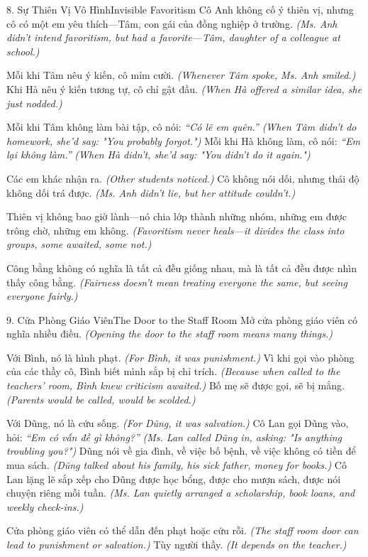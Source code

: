 \begin{truyen}{8. Sự Thiên Vị Vô Hình}{Invisible Favoritism}
Cô Anh không cố ý thiên vị, nhưng cô có một em yêu thích—Tâm, con gái của đồng nghiệp ở trường.
\textit{(Ms. Anh didn't intend favoritism, but had a favorite—Tâm, daughter of a colleague at school.)}

Mỗi khi Tâm nêu ý kiến, cô mỉm cười.
\textit{(Whenever Tâm spoke, Ms. Anh smiled.)}
Khi Hà nêu ý kiến tương tự, cô chỉ gật đầu.
\textit{(When Hà offered a similar idea, she just nodded.)}

Mỗi khi Tâm không làm bài tập, cô nói: \textit{``Có lẽ em quên.''}
\textit{(When Tâm didn't do homework, she'd say: "You probably forgot.")}
Mỗi khi Hà không làm, cô nói: \textit{``Em lại không làm.''  }
\textit{(When Hà didn't, she'd say: "You didn't do it again.")}

Các em khác nhận ra.
\textit{(Other students noticed.)}
Cô không nói dối, nhưng thái độ không dối trá được.
\textit{(Ms. Anh didn't lie, but her attitude couldn't.)}

Thiên vị không bao giờ lành—nó chia lớp thành những nhóm, những em được trông chờ, những em không.
\textit{(Favoritism never heals—it divides the class into groups, some awaited, some not.)}
\end{truyen}

\begin{baihoc}
Công bằng không có nghĩa là tất cả đều giống nhau, mà là tất cả đều được nhìn thấy công bằng.
\textit{(Fairness doesn't mean treating everyone the same, but seeing everyone fairly.)}
\end{baihoc}

\begin{truyen}{9. Cửa Phòng Giáo Viên}{The Door to the Staff Room}
Mở cửa phòng giáo viên có nghĩa nhiều điều.
\textit{(Opening the door to the staff room means many things.)}

Với Bình, nó là hình phạt.
\textit{(For Bình, it was punishment.)}
Vì khi gọi vào phòng của các thầy cô, Bình biết mình sắp bị chỉ trích.
\textit{(Because when called to the teachers' room, Bình knew criticism awaited.)}
Bố mẹ sẽ được gọi, sẽ bị mắng.
\textit{(Parents would be called, would be scolded.)}

Với Dũng, nó là cứu sống.
\textit{(For Dũng, it was salvation.)}
Cô Lan gọi Dũng vào, hỏi: \textit{``Em có vấn đề gì không?''}
\textit{(Ms. Lan called Dũng in, asking: "Is anything troubling you?")}
Dũng nói về gia đình, về việc bố bệnh, về việc không có tiền để mua sách.
\textit{(Dũng talked about his family, his sick father, money for books.)}
Cô Lan lặng lẽ sắp xếp cho Dũng được học bổng, được cho mượn sách, được nói chuyện riêng mỗi tuần.
\textit{(Ms. Lan quietly arranged a scholarship, book loans, and weekly check-ins.)}

Cửa phòng giáo viên có thể dẫn đến phạt hoặc cứu rỗi.
\textit{(The staff room door can lead to punishment or salvation.)}
Tùy người thầy.
\textit{(It depends on the teacher.)}
\end{truyen}

